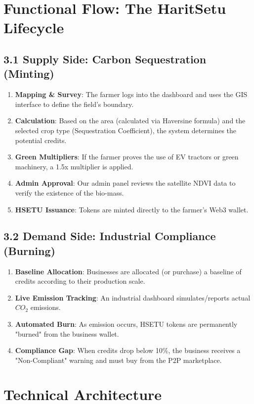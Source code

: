 \documentclass[11pt,a4paper]{article}
\begin{document}
\section{Functional Flow: The HaritSetu Lifecycle}
\subsection{3.1 Supply Side: Carbon Sequestration (Minting)}
\begin{enumerate}
    \item \textbf{Mapping & Survey}: The farmer logs into the dashboard and uses the GIS interface to define the field's boundary.
    \item \textbf{Calculation}: Based on the area (calculated via Haversine formula) and the selected crop type (Sequestration Coefficient), the system determines the potential credits.
    \item \textbf{Green Multipliers}: If the farmer proves the use of EV tractors or green machinery, a 1.5x multiplier is applied.
    \item \textbf{Admin Approval}: Our admin panel reviews the satellite NDVI data to verify the existence of the bio-mass.
    \item \textbf{HSETU Issuance}: Tokens are minted directly to the farmer's Web3 wallet.
\end{enumerate}

\subsection{3.2 Demand Side: Industrial Compliance (Burning)}
\begin{enumerate}
    \item \textbf{Baseline Allocation}: Businesses are allocated (or purchase) a baseline of credits according to their production scale.
    \item \textbf{Live Emission Tracking}: An industrial dashboard simulates/reports actual $CO_2$ emissions.
    \item \textbf{Automated Burn}: As emission occurs, HSETU tokens are permanently "burned" from the business wallet.
    \item \textbf{Compliance Gap}: When credits drop below 10\%, the business receives a "Non-Compliant" warning and must buy from the P2P marketplace.
\end{enumerate}

\section{Technical Architecture}
\end{document}
